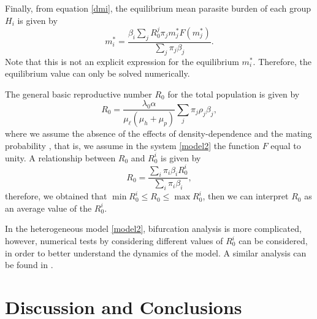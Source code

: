 \documentclass[eng]{MMSB-class-eng}
\begin{document}
{Finally, from equation \eqref{dmi},  the equilibrium mean parasite burden of each group $H_{i}$ is given by
\begin{equation}
m_{i}^*=\frac{\beta_{i}\sum_jR_0^j\pi_jm_j^* F(m_j^*)}{ \sum_j \pi_j\beta_{j}}.
\end{equation}
Note that this is not an explicit expression for the equilibrium $m_{i}^*$. Therefore, the equilibrium value can only be solved numerically.
}

The general basic reproductive number $R_0$ for the total population is given by %
\begin{equation}\label{valorR0}
R_{0}=\frac{\lambda_0 \alpha }
{ \mu_{\ell}(\mu_{h}+\mu_p)}
\sum_j \pi_j \rho_{j} \beta_{j},   
\end{equation}
where we assume the absence of the effects of density-dependence and the mating probability \citep{anderson1992infectious}, that is, we assume in the system \eqref{model2} the function $F$ equal to unity.
A relationship between $R_0$ and $R_0^i$ is given by
\begin{equation}
R_{0}=\frac{\sum_i \pi_i\beta_{i}R_0^i}
{\sum_i \pi_i \beta_{i}},   
\end{equation}
therefore, we obtained that $\min R_0^i\leq R_0 \leq \max R_0^i$, 
then we can interpret $R_0$ as an average value of the $R_0^i$.

{\color{red}
In the heterogeneous model \eqref{model2}, bifurcation analysis is more complicated, however,
numerical tests by considering different values of $R_0^i$ can be considered, in order to
better understand the dynamics of the model. A similar analysis can be found in \citep{burger2016modelling}.
}

\section{Discussion and Conclusions}
\end{document}
